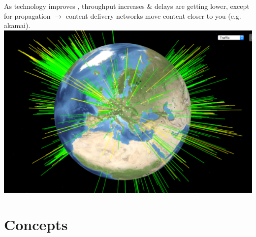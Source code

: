 \documentclass[a4paper, fontsize=8pt, landscape, DIV=1]{scrartcl}
\begin{document}
\begin{multicols*}{4}
			As technology improves , throughput increases \& delays are getting lower, except for propagation $\rightarrow$ content delivery networks move content closer to you (e.g. akamai).
			\includegraphics[width=\columnwidth]{images/Overview/akamai.png}
			\newpage 
			
			\section{Concepts}

\end{multicols*}
\end{document}
